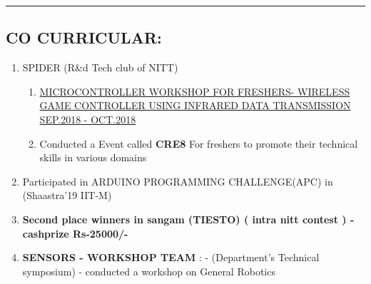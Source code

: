 \documentclass[10pts]{report}
\begin{document}
\par\noindent\rule{\textwidth}{0.1pt}
\begin{flushleft}
         \section*{CO CURRICULAR:}
              \begin{enumerate}
                               \item SPIDER (R\&d Tech club of  NITT)
                                         
                                          \begin{enumerate}
                                                    \item{\href{https://www.youtube.com/watch?v=C6ktntQEmCk}{ MICROCONTROLLER WORKSHOP FOR FRESHERS- WIRELESS GAME CONTROLLER USING INFRARED DATA TRANSMISSION SEP.2018 - OCT.2018}}
                                                    \item Conducted a Event called \textbf{CRE8}  For freshers  to promote their technical skills in various domains
                                           \end{enumerate} 
                                 \item Participated in ARDUINO PROGRAMMING CHALLENGE(APC) in (Shaastra'19 IIT-M)
                                 \item \textbf{Second place winners in sangam  (TIESTO) ( intra nitt contest ) -cashprize Rs-25000/-}
                                 \item \textbf{SENSORS - WORKSHOP TEAM } : - (Department's Technical symposium) - conducted a workshop on General Robotics                                
                      
              \end{enumerate}                                  
\end{flushleft}
\end{document}
